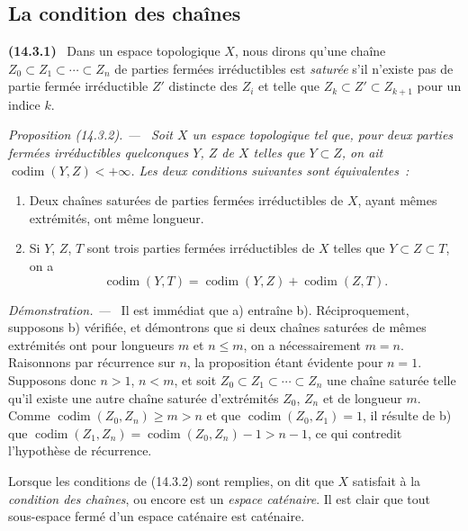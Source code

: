 \documentclass[10pt,oneside]{book}
\makeatletter
\newcommand{\setmanualcurrentlabel}[1]{\def\@currentlabel{#1}}
\newcommand{\oldpage}[2][]{%
  \setcounter{footnote}{0}%
  \marginpar{\scriptsize\textbf{#1}~|~#2}\ignorespaces}
\newenvironment{env}[1][]{\setmanualcurrentlabel{#1}\par\medskip\noindent\textbf{(#1)}\ }{\par}
\newenvironment{proposition}[1][]{%
  \setmanualcurrentlabel{#1}\par\medskip\noindent\itshape Proposition (#1). ---\ }{\par}
\newenvironment{proof}{%
  \par\medskip\noindent\textit{Démonstration. ---\ }}{\par}
\makeatother
\begin{document}
\subsection{La condition des chaînes}
\label{subsection:0.14.3-fr}

\begin{env}[14.3.1]
\label{0.14.3.1-fr}
Dans un espace topologique $X$, nous dirons qu'une chaîne
$Z_0\subset Z_1\subset\cdots\subset Z_n$ de parties fermées irréductibles est
\emph{saturée} s'il n'existe pas de partie fermée irréductible $Z'$ distincte
des $Z_i$ et telle que $Z_k\subset Z'\subset Z_{k+1}$ pour un indice $k$.
\end{env}

\begin{proposition}[14.3.2]
\label{0.14.3.2-fr}
Soit $X$ un espace topologique tel que, pour deux parties fermées
irréductibles quelconques $Y$, $Z$ de $X$ telles que $Y\subset Z$, on ait
$\operatorname{codim}(Y,Z)<+\infty$. Les deux conditions suivantes sont
équivalentes~:
\begin{enumerate}
  \item[\rm(a)] Deux chaînes saturées de parties fermées irréductibles de $X$,
  ayant mêmes extrémités, ont même longueur.
  \item[\rm(b)] Si $Y$, $Z$, $T$ sont trois parties fermées irréductibles de
  $X$ telles que $Y\subset Z\subset T$, on a
  \[
    \operatorname{codim}(Y,T)=
    \operatorname{codim}(Y,Z)+\operatorname{codim}(Z,T).
    \tag{14.3.2.1}\label{0.14.3.2.1-fr}
  \]
\end{enumerate}
\end{proposition}

\begin{proof}
Il est immédiat que a) entraîne b). Réciproquement, supposons b) vérifiée, et
démontrons que si deux chaînes saturées de mêmes extrémités ont pour longueurs
$m$ et $n\leq m$, on a nécessairement $m=n$. Raisonnons par récurrence sur
$n$, la proposition étant évidente pour $n=1$. Supposons donc $n>1$, $n<m$,
et soit $Z_0\subset Z_1\subset\cdots\subset Z_n$ une
\oldpage[0\textsubscript{IV-1}]{11}
chaîne saturée telle qu'il existe une autre chaîne saturée d'extrémités
$Z_0$, $Z_n$ et de longueur $m$. Comme
$\operatorname{codim}(Z_0,Z_n)\geq m>n$ et que
$\operatorname{codim}(Z_0,Z_1)=1$, il résulte de b) que
$\operatorname{codim}(Z_1,Z_n)=\operatorname{codim}(Z_0,Z_n)-1>n-1$, ce qui
contredit l'hypothèse de récurrence.
\end{proof}

Lorsque les conditions de (14.3.2) sont remplies, on dit que $X$ satisfait à
la \emph{condition des chaînes}, ou encore est un \emph{espace caténaire}. Il
est clair que tout sous-espace fermé d'un espace caténaire est caténaire.
\end{document}
